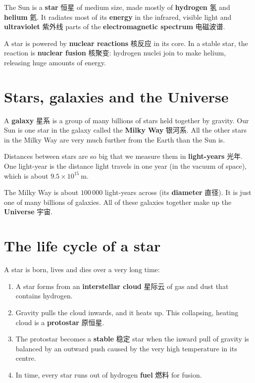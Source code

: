 \documentclass[11pt]{article}
\begin{document}
The Sun is a \textbf{star} 恒星 of medium size, made mostly of \textbf{hydrogen} 氢 and \textbf{helium} 氦. It radiates most of its \textbf{energy} in the infrared, visible light and \textbf{ultraviolet} 紫外线 parts of the \textbf{electromagnetic spectrum} 电磁波谱.

A star is powered by \textbf{nuclear reactions} 核反应 in its core. In a stable star, the reaction is \textbf{nuclear fusion} 核聚变: hydrogen nuclei join to make helium, releasing huge amounts of energy.

\section*{Stars, galaxies and the Universe}

A \textbf{galaxy} 星系 is a group of many billions of stars held together by gravity. Our Sun is one star in the galaxy called the \textbf{Milky Way} 银河系. All the other stars in the Milky Way are very much further from the Earth than the Sun is.

Distances between stars are so big that we measure them in \textbf{light-years} 光年. One light-year is the distance light travels in one year (in the vacuum of space), which is about $9.5 \times 10^{15}\ \text{m}$.

The Milky Way is about $100\,000$ light-years across (its \textbf{diameter} 直径). It is just one of many billions of galaxies. All of these galaxies together make up the \textbf{Universe} 宇宙.

\section*{The life cycle of a star}

A star is born, lives and dies over a very long time:

\begin{enumerate}
\item A star forms from an \textbf{interstellar cloud} 星际云 of gas and dust that contains hydrogen.

\item Gravity pulls the cloud inwards, and it heats up. This collapsing, heating cloud is a \textbf{protostar} 原恒星.

\item The protostar becomes a \textbf{stable} 稳定 star when the inward pull of gravity is balanced by an outward push caused by the very high temperature in its centre.

\item In time, every star runs out of hydrogen \textbf{fuel} 燃料 for fusion.

\end{enumerate}
\end{document}
